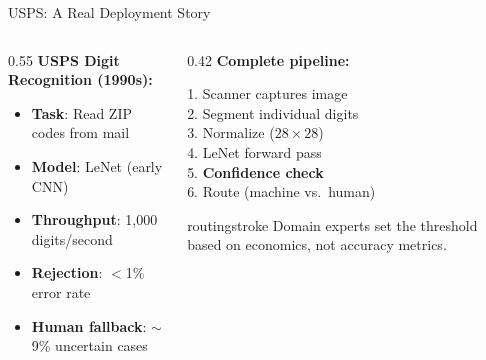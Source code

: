 \documentclass[aspectratio=169, 12pt]{beamer}
\begin{document}
\begin{frame}{USPS: A Real Deployment Story}

\small
\begin{columns}[T]
  \begin{column}{0.55\textwidth}
    \textbf{USPS Digit Recognition (1990s):}
    \begin{itemize}\setlength\itemsep{0pt}
      \item \textbf{Task}: Read ZIP codes from mail
      \item \textbf{Model}: LeNet (early CNN)
      \item \textbf{Throughput}: 1,000 digits/second
      \item \textbf{Rejection}: $<$1\% error rate
      \item \textbf{Human fallback}: $\sim$9\% uncertain cases
    \end{itemize}

    \vspace{0.1cm}
  \end{column}
  \begin{column}{0.42\textwidth}
    \vspace{0.1cm}
    \textbf{Complete pipeline:}

    \vspace{0.1cm}
    {\footnotesize
    1. Scanner captures image\\
    2. Segment individual digits\\
    3. Normalize ($28\times28$)\\
    4. LeNet forward pass\\
    5. \textcolor{errorstroke}{\textbf{Confidence check}}\\
    6. Route (machine vs.\ human)
    }

    \vspace{0.1cm}
    \begin{mlsyscard}{routingstroke}
    {\footnotesize Domain experts set the threshold based on economics, not accuracy metrics.}
    \end{mlsyscard}
  \end{column}
\end{columns}

\end{frame}
\end{document}
